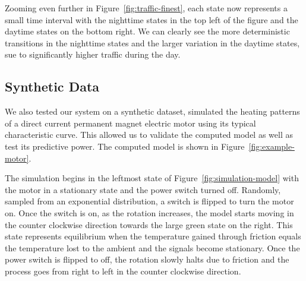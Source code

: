 Zooming even further in Figure~\ref{fig:traffic-finest}, each state now represents a small time interval with the nighttime states in the top left of the figure and the daytime states on the bottom right. We can clearly see the more deterministic transitions in the nighttime states  and the larger variation in the daytime states, sue to significantly higher traffic during the day.



\subsection{Synthetic Data}
We also tested our system on a synthetic dataset,
simulated the heating patterns of a direct current permanent magnet electric motor \cite{book:1107411} using its typical characteristic curve. %
This allowed us to validate the computed model as well as test its predictive power.  
The computed model is shown in Figure~\ref{fig:example-motor}. 

The simulation begins in the leftmost state of Figure~\ref{fig:simulation-model} with the motor in a stationary state
and the power switch turned off. Randomly, sampled from an exponential distribution, a switch is flipped to turn the motor on. Once the switch is on, as the rotation increases, the model starts moving in the counter clockwise
direction towards the large green state on the right. This state represents equilibrium when the temperature
gained through friction equals the temperature lost to the ambient and the signals become stationary.
Once the power switch is flipped to off, the rotation slowly halts due to friction and the process goes from right to
left in the counter clockwise direction. 

